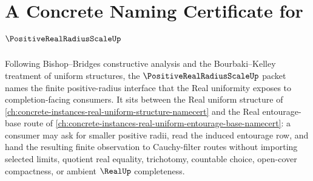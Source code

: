 \chapter{A Concrete Naming Certificate for $\PositiveRealRadiusScaleUp$}
\label{ch:concrete-instances-positive-real-radius-scale-namecert}

Following Bishop--Bridges constructive analysis and the Bourbaki--Kelley treatment of uniform structures, the $\PositiveRealRadiusScaleUp$ packet names the finite positive-radius interface that the Real uniformity exposes to completion-facing consumers. It sits between the Real uniform structure of \autoref{ch:concrete-instances-real-uniform-structure-namecert} and the Real entourage-base route of \autoref{ch:concrete-instances-real-uniform-entourage-base-namecert}: a consumer may ask for smaller positive radii, read the induced entourage row, and hand the resulting finite observation to Cauchy-filter routes without importing selected limits, quotient real equality, trichotomy, countable choice, open-cover compactness, or ambient $\RealUp$ completeness.

